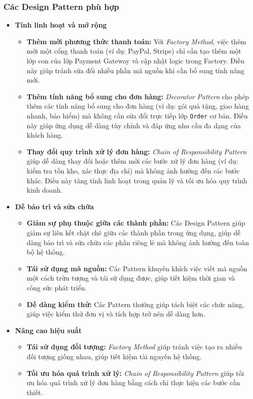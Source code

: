 \subsubsection{Các Design Pattern phù hợp}
\begin{itemize}
  \item \textbf{Tính linh hoạt và mở rộng}
        \begin{itemize}
          \item \textbf{Thêm mới phương thức thanh toán:} Với \textit{Factory Method}, việc thêm mới một cổng thanh toán (ví dụ: PayPal, Stripe) chỉ cần tạo thêm một lớp con của lớp Payment Gateway và cập nhật logic trong Factory. Điều này giúp tránh sửa đổi nhiều phần mã nguồn khi cần bổ sung tính năng mới.
          \item \textbf{Thêm tính năng bổ sung cho đơn hàng:} \textit{Decorator Pattern} cho phép thêm các tính năng bổ sung cho đơn hàng (ví dụ: gói quà tặng, giao hàng nhanh, bảo hiểm) mà không cần sửa đổi trực tiếp lớp \verb|Order| cơ bản. Điều này giúp ứng dụng dễ dàng tùy chỉnh và đáp ứng nhu cầu đa dạng của khách hàng.
          \item \textbf{Thay đổi quy trình xử lý đơn hàng:} \textit{Chain of Responsibility Pattern} giúp dễ dàng thay đổi hoặc thêm mới các bước xử lý đơn hàng (ví dụ: kiểm tra tồn kho, xác thực địa chỉ) mà không ảnh hưởng đến các bước khác. Điều này tăng tính linh hoạt trong quản lý và tối ưu hóa quy trình kinh doanh.
        \end{itemize}
  \item \textbf{Dễ bảo trì và sửa chữa}
        \begin{itemize}
          \item \textbf{Giảm sự phụ thuộc giữa các thành phần:} Các Design Pattern giúp giảm sự liên kết chặt chẽ giữa các thành phần trong ứng dụng, giúp dễ dàng bảo trì và sửa chữa các phần riêng lẻ mà không ảnh hưởng đến toàn bộ hệ thống.
          \item \textbf{Tái sử dụng mã nguồn:} Các Pattern khuyến khích việc viết mã nguồn một cách trừu tượng và tái sử dụng được, giúp tiết kiệm thời gian và công sức phát triển.
          \item \textbf{Dễ dàng kiểm thử:} Các Pattern thường giúp tách biệt các chức năng, giúp việc kiểm thử đơn vị và tích hợp trở nên dễ dàng hơn.
        \end{itemize}
  \item \textbf{Nâng cao hiệu suất}
        \begin{itemize}
          \item \textbf{Tái sử dụng đối tượng:} \textit{Factory Method} giúp tránh việc tạo ra nhiều đối tượng giống nhau, giúp tiết kiệm tài nguyên hệ thống.
          \item \textbf{Tối ưu hóa quá trình xử lý:} \textit{Chain of Responsibility Pattern} giúp tối ưu hóa quá trình xử lý đơn hàng bằng cách chỉ thực hiện các bước cần thiết.
        \end{itemize}
\end{itemize}

